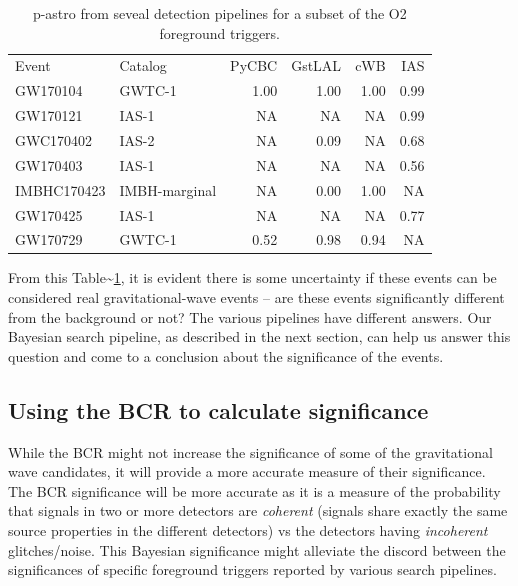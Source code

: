 \documentclass[%
 reprint,
 amsmath,amssymb,
 aps,
]{revtex4}
\begin{document}
\begin{table}[t]

\caption[p-astro for various O2 foreground triggers]{\label{tab:O2significancesWObcr}p-astro from seveal detection pipelines for a subset of the O2 foreground triggers.}
\centering
\begin{tabular}{llrrrr}
Event & Catalog & PyCBC & GstLAL & cWB & IAS\\
GW170104 & GWTC-1 & 1.00 & 1.00 & 1.00 & 0.99\\
GW170121 & IAS-1 & NA & NA & NA & 0.99\\
GWC170402 & IAS-2 & NA & 0.09 & NA & 0.68\\
GW170403 & IAS-1 & NA & NA & NA & 0.56\\
IMBHC170423 & IMBH-marginal & NA & 0.00 & 1.00 & NA\\
GW170425 & IAS-1 & NA & NA & NA & 0.77\\
GW170729 & GWTC-1 & 0.52 & 0.98 & 0.94 & NA\\
\end{tabular}
\end{table}

From this Table\textasciitilde\ref{tab:O2significancesWObcr}, it is evident there is some uncertainty if these events can be considered real
gravitational-wave events -- are these events significantly different from the background or not? The various pipelines
have different answers. Our Bayesian search pipeline, as described in the next section, can help us answer this question
and come to a conclusion about the significance of the events.

\hypertarget{using-the-bcr-to-calculate-significance}{%
\subsection{Using the BCR to calculate significance}\label{using-the-bcr-to-calculate-significance}}

While the BCR might not increase the significance of some of the gravitational wave candidates, it will provide a more
accurate measure of their significance. The BCR significance will be more accurate as it is a measure of the probability
that signals in two or more detectors are \emph{coherent} (signals share exactly the same source properties in the different
detectors) vs the detectors having \emph{incoherent} glitches/noise. This Bayesian significance might alleviate the discord
between the significances of specific foreground triggers reported by various search pipelines.
\end{document}
